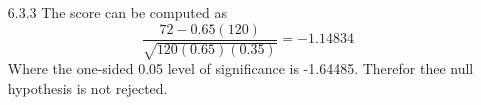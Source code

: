 \documentclass[11pt,fleqn]{article}
\begin{document}
\begin{enumerate}
(b) 
The Z score 0.905822 corresponds to a P-value of 0.817485, which means that any
$\alpha$ value above 0.19 would cause the rejection of $H_0$
\item[6.3.3]
  The score can be computed as 
  \[
  \frac{72-0.65(120)}{\sqrt{120(0.65)(0.35)}} = -1.14834
  \]
  Where the one-sided 0.05 level of significance is -1.64485. Therefor thee
  null hypothesis is not rejected. 
\end{enumerate}
\end{document}
